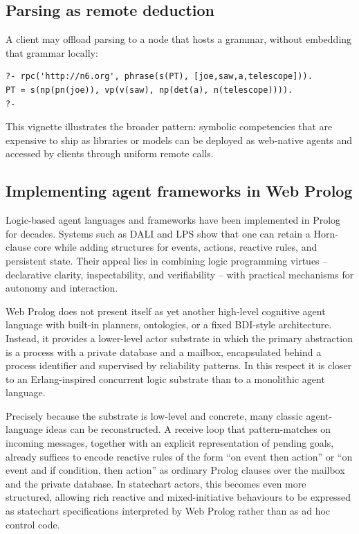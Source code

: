\subsection{Parsing as remote deduction}
\label{sec:remote-parsing}

A client may offload parsing to a node that hosts a grammar, without embedding that grammar locally:

\begin{verbatim}
?- rpc('http://n6.org', phrase(s(PT), [joe,saw,a,telescope])).
PT = s(np(pn(joe)), vp(v(saw), np(det(a), n(telescope)))).
?-
\end{verbatim}

\noindent This vignette illustrates the broader pattern: symbolic competencies that are expensive to ship as libraries or models can be deployed as web-native agents and accessed by clients through uniform remote calls.

\subsection{Implementing agent frameworks in Web Prolog}
\label{sec:agent-frameworks-on-web-prolog}

Logic-based agent languages and frameworks have been implemented in Prolog for decades. Systems such as DALI \citep{costantini2004dali} and LPS \citep{kowalski2015reactive} show that one can retain a Horn-clause core while adding structures for events, actions, reactive rules, and persistent state. Their appeal lies in combining logic programming virtues -- declarative clarity, inspectability, and verifiability -- with practical mechanisms for autonomy and interaction.

Web Prolog does not present itself as yet another high-level cognitive agent language with built-in planners, ontologies, or a fixed BDI-style architecture. Instead, it provides a lower-level actor substrate in which the primary abstraction is a process with a private database and a mailbox, encapsulated behind a process identifier and supervised by reliability patterns. In this respect it is closer to an Erlang-inspired concurrent logic substrate than to a monolithic agent language.

Precisely because the substrate is low-level and concrete, many classic agent-language ideas can be reconstructed. A receive loop that pattern-matches on incoming messages, together with an explicit representation of pending goals, already suffices to encode reactive rules of the form ``on event then action'' or ``on event and if condition, then action'' as ordinary Prolog clauses over the mailbox and the private database. In statechart actors, this becomes even more structured, allowing rich reactive and mixed-initiative behaviours to be expressed as statechart specifications interpreted by Web Prolog rather than as ad hoc control code.

